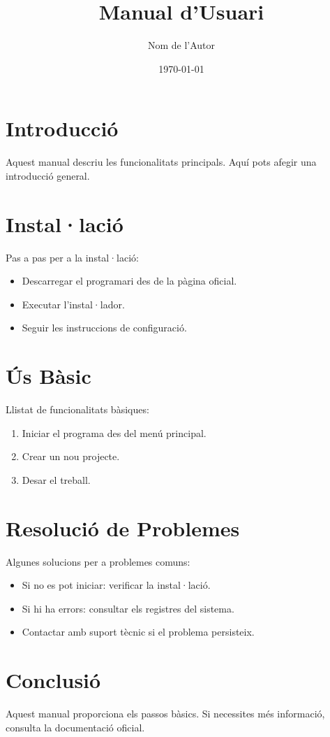 \documentclass[a4paper,12pt]{article}
\begin{document}
\title{Manual d'Usuari}
\author{Nom de l'Autor}
\date{\today}

\maketitle

\tableofcontents
\newpage

\section{Introducció}
Aquest manual descriu les funcionalitats principals. Aquí pots afegir una introducció general.

\section{Instal·lació}
Pas a pas per a la instal·lació:
\begin{itemize}
    \item Descarregar el programari des de la pàgina oficial.
    \item Executar l'instal·lador.
    \item Seguir les instruccions de configuració.
\end{itemize}

\section{Ús Bàsic}
Llistat de funcionalitats bàsiques:
\begin{enumerate}
    \item Iniciar el programa des del menú principal.
    \item Crear un nou projecte.
    \item Desar el treball.
\end{enumerate}

\section{Resolució de Problemes}
Algunes solucions per a problemes comuns:
\begin{itemize}
    \item Si no es pot iniciar: verificar la instal·lació.
    \item Si hi ha errors: consultar els registres del sistema.
    \item Contactar amb suport tècnic si el problema persisteix.
\end{itemize}

\section{Conclusió}
Aquest manual proporciona els passos bàsics. Si necessites més informació, consulta la documentació oficial.
\end{document}
